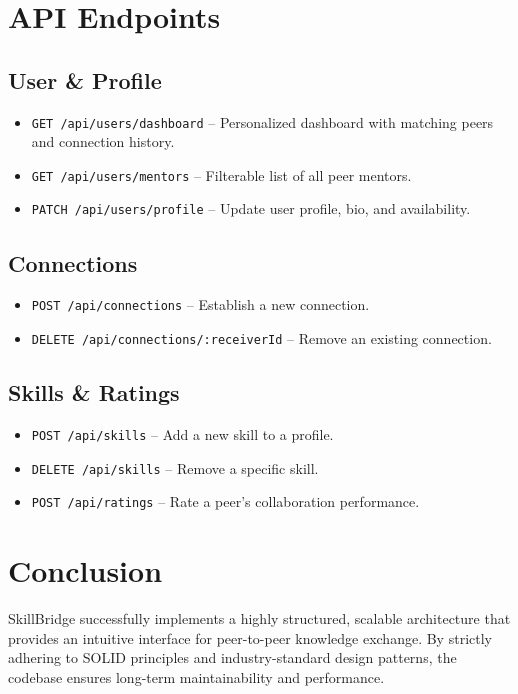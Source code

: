 \documentclass[12pt,a4paper]{article}
\begin{document}
\section{API Endpoints}

\subsection{User \& Profile}
\begin{itemize}
    \item \texttt{GET /api/users/dashboard} – Personalized dashboard with matching peers and connection history.
    \item \texttt{GET /api/users/mentors} – Filterable list of all peer mentors.
    \item \texttt{PATCH /api/users/profile} – Update user profile, bio, and availability.
\end{itemize}

\subsection{Connections}
\begin{itemize}
    \item \texttt{POST /api/connections} – Establish a new connection.
    \item \texttt{DELETE /api/connections/:receiverId} – Remove an existing connection.
\end{itemize}

\subsection{Skills \& Ratings}
\begin{itemize}
    \item \texttt{POST /api/skills} – Add a new skill to a profile.
    \item \texttt{DELETE /api/skills} – Remove a specific skill.
    \item \texttt{POST /api/ratings} – Rate a peer's collaboration performance.
\end{itemize}

\section{Conclusion}
SkillBridge successfully implements a highly structured, scalable architecture that provides an intuitive interface for peer-to-peer knowledge exchange. By strictly adhering to SOLID principles and industry-standard design patterns, the codebase ensures long-term maintainability and performance.
\end{document}
